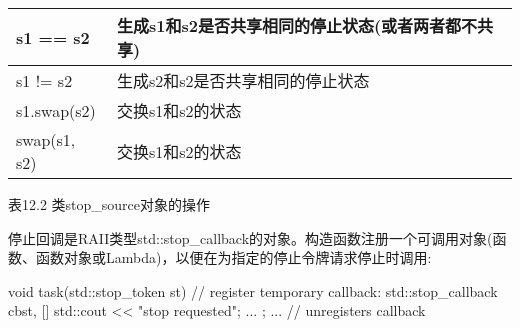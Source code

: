 \begin{longtable}[c]{|l|l|}
s1 == s2                      & 生成s1和s2是否共享相同的停止状态(或者两者都不共享)             \\ \hline
s1 != s2                      & 生成s2和s2是否共享相同的停止状态                           \\ \hline
s1.swap(s2)                   & 交换s1和s2的状态                                                       \\ \hline
swap(s1, s2)                  & 交换s1和s2的状态                                                       \\ \hline
\end{longtable}

\begin{center}
表12.2 类stop\_source对象的操作
\end{center}


停止回调是RAII类型std::stop\_callback的对象。构造函数注册一个可调用对象(函数、函数对象或Lambda)，以便在为指定的停止令牌请求停止时调用:

\begin{cpp}
void task(std::stop_token st)
{
	// register temporary callback:
	std::stop_callback cb{st, []{
			std::cout << "stop requested\n";
			...
	}};
	...
} // unregisters callback
\end{cpp}

